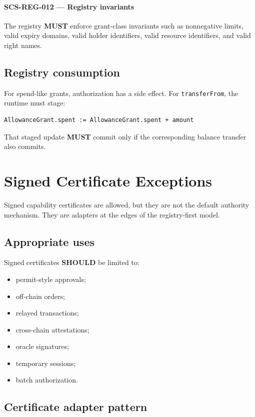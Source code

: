 \documentclass[11pt]{article}
\newcommand{\MUST}{\textbf{MUST}}
\newcommand{\SHOULD}{\textbf{SHOULD}}
\newcommand{\req}[2]{\paragraph{#1}#2\par}
\newcommand{\code}[1]{\texttt{#1}}
\begin{document}
\req{SCS-REG-012 --- Registry invariants}{The registry \MUST{} enforce grant-class invariants such as nonnegative limits, valid expiry domains, valid holder identifiers, valid resource identifiers, and valid right names.}

\subsection{Registry consumption}

For spend-like grants, authorization has a side effect. For \code{transferFrom}, the runtime must stage:

\begin{lstlisting}
AllowanceGrant.spent := AllowanceGrant.spent + amount
\end{lstlisting}

That staged update \MUST{} commit only if the corresponding balance transfer also commits.



\section{Signed Certificate Exceptions}

Signed capability certificates are allowed, but they are not the default authority mechanism. They are adapters at the edges of the registry-first model.

\subsection{Appropriate uses}

Signed certificates \SHOULD{} be limited to:

\begin{itemize}
  \item permit-style approvals;
  \item off-chain orders;
  \item relayed transactions;
  \item cross-chain attestations;
  \item oracle signatures;
  \item temporary sessions;
  \item batch authorization.
\end{itemize}

\subsection{Certificate adapter pattern}
\end{document}

